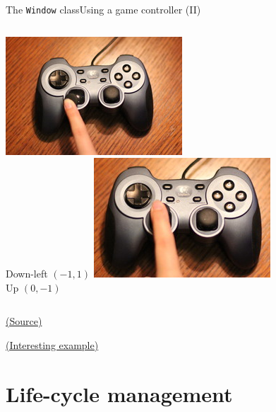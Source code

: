 \documentclass[10pt,compress]{beamer} %
\begin{document}
\begin{frame}{The \texttt{Window} class}{Using a game controller (II)}
\begin{columns}
		\includegraphics[width=\linewidth]{figs/controller-downleft.jpg}\\
		\centering Down-left $(-1, 1)$
		\includegraphics[width=\linewidth]{figs/controller-up.jpg}\\
		\centering Up $(0,-1)$
    \end{columns}

	\centering \tiny \href{https://learn.arcade.academy/en/latest/chapters/19\_user\_control/user\_control.html}{(Source)}

	\bigskip

	\normalsize
	\href{https://api.arcade.academy/en/stable/examples/sprite\_move\_joystick.html}{(Interesting example)}

\end{frame}

\section{Life-cycle management}
\end{document}
